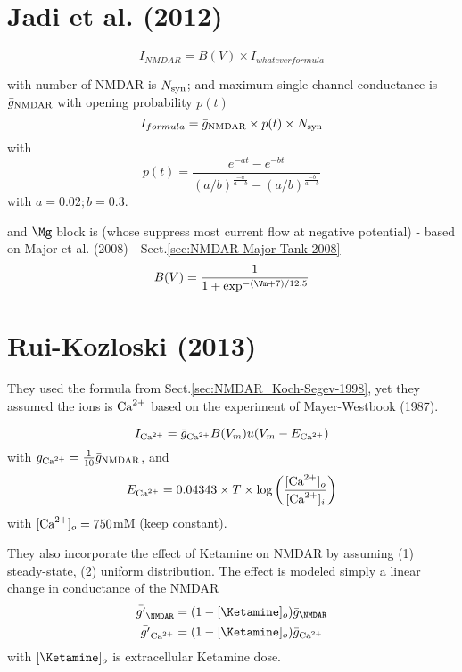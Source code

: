 \section{Jadi et al. (2012)}
\label{sec:NMDAR-Jadi-2012}

\begin{equation}
I_{NMDAR} = B(V) \times I_{whatever formula}
\end{equation}


with number of NMDAR is $N_{\text{syn}}$; and maximum single channel conductance is
$\bar{g}_{\text{NMDAR}}$ with opening probability $p(t)$
\begin{equation}
I_{formula} = \bar{g}_{\text{NMDAR}} \times p(t) \times N_{\text{syn}}
\end{equation}
with
\begin{equation}
p(t) = \frac{e^{-at} - e^{-bt}}{\left(a/b\right)^{\frac{-a}{a-b}} -
\left(a/b\right)^{\frac{-b}{a-b}}}
\end{equation}
with $a=0.02; b=0.3$.


and $\Mg$ block is (whose suppress most current flow at negative potential) -
based on Major et al. (2008) - Sect.\ref{sec:NMDAR-Major-Tank-2008}
\begin{equation}
B(V) = \frac{1}{1 + \exp^{-(\Vm + 7)/12.5}}
\end{equation}

\section{Rui-Kozloski (2013)}
\label{sec:NMDAR-Rui-Kozloski-2013}

They used the formula from Sect.\ref{sec:NMDAR_Koch-Segev-1998}, yet they
assumed the ions is ${\text{Ca}^{2+}}$ based on the experiment of Mayer-Westbook (1987).

\begin{equation}
I_{\text{Ca}^{2+}}= \bar{g}_{\text{Ca}^{2+}}	B(V_m)u(V_m - E_{\text{Ca}^{2+}})
\end{equation}
with $g_{\text{Ca}^{2+}}=\frac{1}{10}\bar{g}_{\text{NMDAR}}$, and 
\begin{equation*}
E_{\text{Ca}^{2+}}	= 0.04343 \times T \times {\text{log}}\left( \frac{[{\text{Ca}^{2+}}]_o}{[{\text{Ca}^{2+}}]_i}\right)
\end{equation*}
with $[{\text{Ca}^{2+}}]_o=750 $mM (keep constant).

They also incorporate the effect of Ketamine on NMDAR by assuming (1)
steady-state, (2) uniform distribution. The effect is modeled simply a linear
change in conductance of the NMDAR
\begin{equation}
\begin{split}
\bar{g'}_\NMDAR &= (1-[\Ketamine]_o) \bar{g}_\NMDAR \\
\bar{g'}_\Ca &= (1-[\Ketamine]_o) \bar{g}_\Ca
\end{split} 
\end{equation}
with $[\Ketamine]_o$ is extracellular Ketamine dose.

